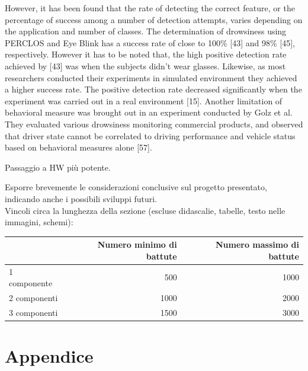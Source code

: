 \documentclass[12pt]{article}
\begin{document}
However, it has been found that the rate of detecting the correct feature, or the percentage of success among a number of detection attempts, varies depending on the application and number of classes. The determination of drowsiness using PERCLOS and Eye Blink has a success rate of close to 100\% [43] and 98\% [45], respectively. However it has to be noted that, the high positive detection rate achieved by [43] was when the subjects didn’t wear glasses. Likewise, as most researchers conducted their experiments in simulated environment they achieved a higher success rate. The positive detection rate decreased significantly when the experiment was carried out in a real environment [15].
Another limitation of behavioral measure was brought out in an experiment conducted by Golz et al. They evaluated various drowsiness monitoring commercial products, and observed that driver state cannot be correlated to driving performance and vehicle status based on behavioral measures alone [57].

Passaggio a HW più potente.

Esporre brevemente le considerazioni conclusive sul progetto presentato, indicando anche i possibili sviluppi futuri.\\

Vincoli circa la lunghezza della sezione (escluse didascalie, tabelle, testo nelle immagini, schemi):

\vspace{1cm}
\begin{tabular}{l|rr}
 & Numero minimo di battute & Numero massimo di battute \\
 \hline
 1 componente & 500 & 1000 \\
 2 componenti & 1000 & 2000 \\
 3 componenti & 1500 & 3000 \\
 \hline
\end{tabular}

\newpage



\appendix
{}
\section*{Appendice}
\end{document}
